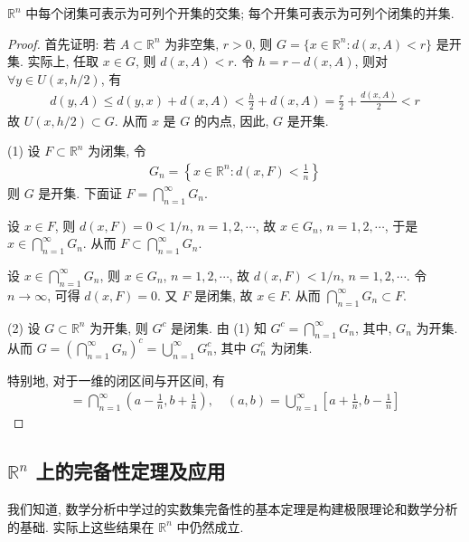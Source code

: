 \documentclass[../../main.tex]{subfiles}
\begin{document}
\begin{proposition}
$\mathbb{R}^n$ 中每个闭集可表示为可列个开集的交集; 每个开集可表示为可列个闭集的并集.
\end{proposition}
\begin{proof}
首先证明: 若 $A \subset \mathbb{R}^n$ 为非空集, $r > 0$, 则 $G = \{x \in \mathbb{R}^n : d(x, A) < r\}$ 是开集. 实际上, 任取 $x \in G$, 则 $d(x, A) < r$. 令 $h = r - d(x, A)$, 则对 $\forall y \in U(x, h/2)$, 有
\begin{align*}
d(y, A) \leqslant d(y, x) + d(x, A) < \frac{h}{2} + d(x, A) = \frac{r}{2} + \frac{d(x, A)}{2} < r
\end{align*}
故 $U(x, h/2) \subset G$. 从而 $x$ 是 $G$ 的内点, 因此, $G$ 是开集.

(1) 设 $F \subset \mathbb{R}^n$ 为闭集, 令
\begin{align*}
G_n = \left\{x \in \mathbb{R}^n : d(x, F) < \frac{1}{n}\right\}
\end{align*}
则 $G$ 是开集. 下面证 $F = \bigcap_{n = 1}^{\infty} G_n$.

设 $x \in F$, 则 $d(x, F) = 0 < 1/n$, $n = 1, 2, \cdots$, 故 $x \in G_n$, $n = 1, 2, \cdots$, 于是 $x \in \bigcap_{n = 1}^{\infty} G_n$. 从而 $F \subset \bigcap_{n = 1}^{\infty} G_n$.

设 $x \in \bigcap_{n = 1}^{\infty} G_n$, 则 $x \in G_n$, $n = 1, 2, \cdots$, 故 $d(x, F) < 1/n$, $n = 1, 2, \cdots$. 令 $n \to \infty$, 可得 $d(x, F) = 0$. 又 $F$ 是闭集, 故 $x \in F$. 从而 $\bigcap_{n = 1}^{\infty} G_n \subset F$.

(2) 设 $G \subset \mathbb{R}^n$ 为开集, 则 $G^c$ 是闭集. 由 (1) 知 $G^c = \bigcap_{n = 1}^{\infty} G_n$, 其中, $G_n$ 为开集. 从而 $G = \left(\bigcap_{n = 1}^{\infty} G_n\right)^c = \bigcup_{n = 1}^{\infty} G_n^c$, 其中 $G_n^c$ 为闭集.

特别地, 对于一维的闭区间与开区间, 有
\begin{align*}
[a, b] = \bigcap_{n = 1}^{\infty}\left(a - \frac{1}{n}, b + \frac{1}{n}\right), \quad (a, b) = \bigcup_{n = 1}^{\infty}\left[a + \frac{1}{n}, b - \frac{1}{n}\right]
\end{align*}

\end{proof}

\subsection{$\mathbb{R}^n$ 上的完备性定理及应用}

我们知道, 数学分析中学过的实数集完备性的基本定理是构建极限理论和数学分析的基础. 实际上这些结果在 $\mathbb{R}^n$ 中仍然成立.
\end{document}
